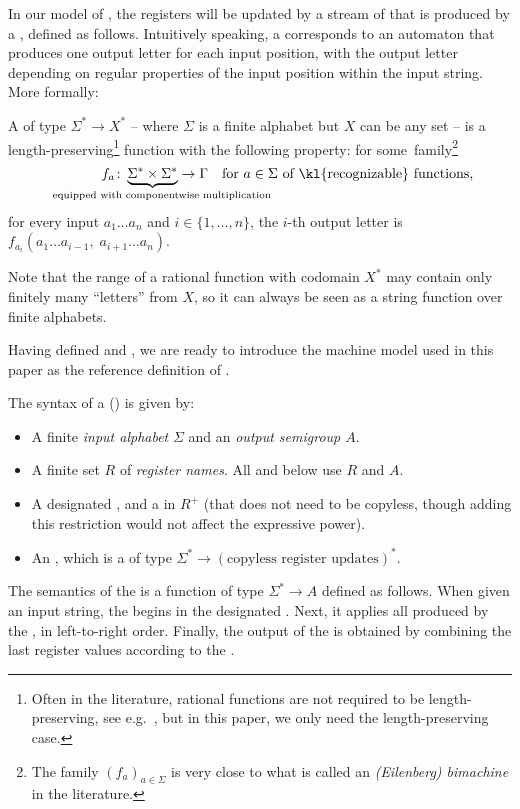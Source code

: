 \AP In our model of , the registers will be updated by a
stream of  that is produced by a , defined as
follows. Intuitively speaking, a  corresponds to an automaton
that produces one output letter for each input position, with the output letter
depending on regular properties of the input position within the input string.
More formally:
\begin{definition}
  A  of type $\Sigma^* \to X^*$ -- where $\Sigma$ is
  a finite alphabet but $X$ can be any set -- is a length-preserving\footnote{Often in the literature, rational
    functions are not required to be length-preserving, see
    e.g.~\cite[p.~525]{sakarovitch2009elements}, but in this paper, we only need
    the length-preserving case.} function with the following property: for some~family\footnote{The family $(f_a)_{a\in\Sigma}$ is very close to what is called an \emph{(Eilenberg) bimachine} in the literature.}
  \[ \qquad\qquad f_a \colon \myunderbrace{\Sigma^* \times \Sigma^*}{\qquad equipped with componentwise multiplication} \to \Gamma\quad \text{for $a \in \Sigma$ of \kl{recognizable} functions,} \]
  for every input $a_1 \dots a_n$ and $i\in\{1,\dots,n\}$, the $i$-th output letter is $f_{a_i}(a_1 \dots a_{i-1},\; a_{i+1} \dots a_n)$.
\end{definition}
Note that the range of a rational function with codomain $X^*$ may contain only
finitely many \enquote{letters} from $X$, so it can always be
seen as a string function over finite alphabets.

\AP Having defined  and , we are ready to introduce the machine model used in this paper as the reference definition of .

\begin{definition}\label{def:usual-sst}
    The syntax of a  (\sst) is given by:
\begin{itemize}
    \item A finite \emph{input alphabet} $\Sigma$ and an \emph{output semigroup $A$}.
    \item A finite set $R$ of \emph{register names}. All  and  below use $R$ and $A$.
    \item A designated , and a  in $R^+$ (that does not need to be copyless, though
      adding this restriction would not affect the expressive power).
    \item An , which is a  of type 
        $\Sigma^* \to (\text{copyless register updates})^*$.
\end{itemize}
\end{definition}
The semantics of the \sst{} is a function of type $\Sigma^* \to A$ defined as follows. When given an input string, the \sst{} begins in the designated . Next, it applies all  produced by the , in left-to-right order. Finally, the output of the \sst{} is obtained by combining the last register values according to the .

